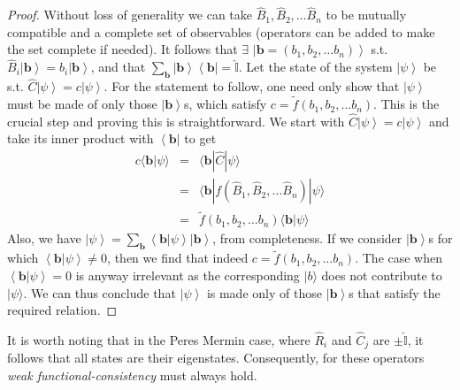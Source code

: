 \documentclass[doublecol,british]{epl2}
\theoremstyle{plain}
\theoremstyle{plain}
\theoremstyle{definition}
\theoremstyle{remark}
\theoremstyle{remark}
\theoremstyle{remark}
\theoremstyle{plain}
\theoremstyle{plain}
\theoremstyle{plain}
\theoremstyle{definition}
\theoremstyle{definition}
\begin{document}
\begin{proof} 
Without loss of generality we can take
$\hat{B}_{1},\hat{B}_{2},\dots\hat{B}_{n}$ to be
mutually compatible and a complete set of
observables (operators can be added to make the set
complete if needed).
It follows
that $\exists$
$\left|\mathbf{b}=\left(b_{1},b_{2},\dots
b_{n}\right)\right\rangle $ s.t.
$\hat{B}_{i}\left|\mathbf{b}\right\rangle
=b_{i}\left|\mathbf{b}\right\rangle $,
and that
$\sum_{\mathbf{b}}\left|\mathbf{b}\right\rangle
\left\langle \mathbf{b}\right|=\hat{\mathbb{I}}$.
Let the state of the system
$\left|\psi\right\rangle $ be s.t.
$\hat{C}\left|\psi\right\rangle
=c\left|\psi\right\rangle $. For
the statement to follow, one need only show that
$\left|\psi\right\rangle $ must be made of only
those $\left|\mathbf{b}\right\rangle $s, which
satisfy $c=\tilde
f(b_{1},b_{2},\dots
b_{n})$.  This is the crucial step and
proving this is straightforward. We start with
$\hat{C}\left|\psi\right\rangle
=c\left|\psi\right\rangle $ and take its inner
product with $\left\langle \mathbf{b}\right|$ to
get 
\begin{eqnarray*} 
c \langle \mathbf{b}|\psi\rangle 
& = &
\langle
\mathbf{b} |\hat{C} |\psi
\rangle  
\\
&=&
\langle
\mathbf{b}| f(\hat{B}_{1},\hat{B}_{2},\dots\hat{B}_{n}) |
\psi \rangle
\\ 
&=&
\tilde f (b_{1},b_{2},\dots b_{n})
\langle
\mathbf{b}|\psi\rangle  
\end{eqnarray*}
Also, we have $\left|\psi\right\rangle
=\sum_{\mathbf{b}}\left\langle
\mathbf{b}|\psi\right\rangle
\left|\mathbf{b}\right\rangle $, from
completeness. If we consider
$\left|\mathbf{b}\right\rangle $s for which
$\left\langle \mathbf{b}|\psi\right\rangle \neq0$,
then we find that indeed $c=\tilde
f(b_{1},b_{2},\dots
b_{n})$. The case when $\left\langle
\mathbf{b}|\psi\right\rangle =0$ is anyway
irrelevant as the corresponding $\vert b\rangle$
does not contribute to $\vert \psi\rangle$.
We can thus conclude that
$\left|\psi\right\rangle $ is made only of those
$\left|\mathbf{b}\right\rangle $s that satisfy the
required relation.
\end{proof} 
It is worth noting that in the Peres Mermin
case, where $\hat{R}_{i}$ and $\hat{C}_{j}$ are
$\pm\hat{\mathbb{I}}$, it follows that all
states are their eigenstates. Consequently, for
these operators \emph{weak functional-consistency}
must always hold.
\end{document}
